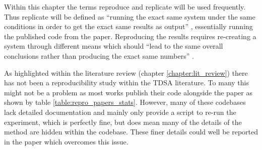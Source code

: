Within this chapter the terms reproduce and replicate will be used frequently. Thus replicate will be defined as ``running the exact same system under the same conditions in order to get the exact same results as output'' \citep{fokkens-etal-2013-offspring}, essentially running the published code from the paper. Reproducing the results requires re-creating a system through different means which should ``lead to the same overall conclusions rather than producing the exact same numbers'' \citep{fokkens-etal-2013-offspring}. 

As highlighted within the literature review (chapter \ref{chapter:lit_review}) there has not been a reproducibility study within the TDSA literature. To many this might not be a problem as most works publish their code alongside the paper as shown by table \ref{table:repro_papers_stats}. However, many of these codebases lack detailed documentation and mainly only provide a script to re-run the experiment, which is perfectly fine, but does mean many of the details of the method are hidden within the codebase. These finer details could well be reported in the paper which overcomes this issue. 

